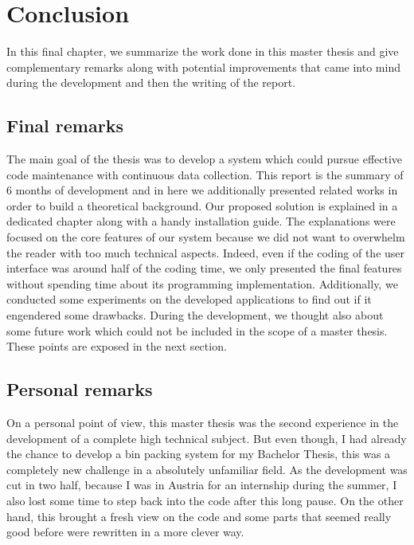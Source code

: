 \chapter{Conclusion} %
\label{chap:conclusion}

In this final chapter, we summarize the work done in this master thesis and give complementary remarks along with potential improvements that came into mind during the development and then the writing of the report.

\section{Final remarks}
The main goal of the thesis was to develop a system which could pursue effective code maintenance with continuous data collection. This report is the summary of 6 months of development and in here we additionally presented related works in order to build a theoretical background. Our proposed solution is explained in a dedicated chapter along with a handy installation guide. The explanations were focused on the core features of our system because we did not want to overwhelm the reader with too much technical aspects. Indeed, even if the coding of the user interface was around half of the coding time, we only presented the final features without spending time about its programming implementation.  Additionally, we conducted some experiments on the developed applications to find out if it engendered some drawbacks. During the development, we thought also about some future work which could not be included in the scope of a master thesis. These points are exposed in the next section.

\section{Personal remarks}

On a personal point of view, this master thesis was the second experience in the development of a complete high technical subject. But even though, I had already the chance to develop a bin packing system for my Bachelor Thesis, this was a completely new challenge in a absolutely unfamiliar field. As the development was cut in two half, because I was in Austria for an internship during the summer, I also lost some time to step back into the code after this long pause. On the other hand, this brought a fresh view on the code and some parts that seemed really good before were rewritten in a more clever way.

